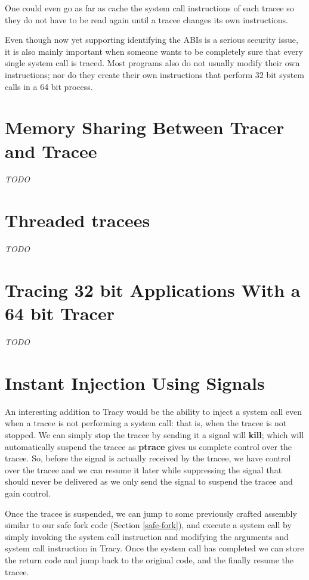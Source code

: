 \documentclass[a4paper, 10pt]{report}
\begin{document}
One could even go as far as cache the system call instructions of each tracee
so they do not have to be read again until a tracee changes its own
instructions.

Even though now yet supporting identifying the ABIs is a serious security issue,
it is also mainly important when someone wants to be completely sure that every
single system call is traced. Most programs also do not usually modify their
own instructions; nor do they create their own instructions that perform 32 bit
system calls in a 64 bit process.

\section{Memory Sharing Between Tracer and Tracee}
\label{memory-share}

\textit{TODO}


\section{Threaded tracees}
\label{future-threaded-tracees}
\textit{TODO}

\section{Tracing 32 bit Applications With a 64 bit Tracer}
\textit{TODO}

\section{Instant Injection Using Signals}
\label{instant-inject}

An interesting addition to Tracy would be the ability to inject a system call
even when a tracee is not performing a system call: that is, when the tracee
is not stopped. We can simply stop the tracee by sending it a signal will
\textbf{kill}; which will automatically suspend the tracee as
\textbf{ptrace} gives us complete control over the tracee.
So, before the signal is actually received by the tracee, we have control
over the tracee and we can resume it later while suppressing the signal that
should never be delivered as we only send the signal to suspend the tracee and
gain control.

Once the tracee is suspended, we can jump to some previously crafted assembly
similar to our safe fork code (Section \ref{safe-fork}), and execute a system
call by simply invoking the system call instruction and modifying the
arguments and system call instruction in Tracy. Once the system call
has completed we can store the return code and jump back to the original code,
and the finally resume the tracee.
\end{document}
